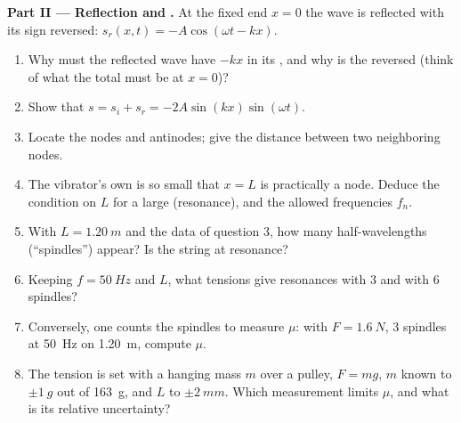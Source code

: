 \begin{problem}
\medskip
\noindent\textbf{Part II --- Reflection and .}
At the fixed end $x = 0$ the wave is reflected with its sign reversed:
$s_r(x, t) = -A\cos(\omega t - kx)$.
\begin{enumerate}[resume]
  \item Why must the reflected wave have $-kx$ in its , and why is
        the  reversed (think of what the total  must be
        at $x = 0$)?
  \item Show that $s = s_i + s_r = -2A\sin(kx)\sin(\omega t)$.
  \item Locate the nodes and antinodes; give the distance between two
        neighboring nodes.
  \item The vibrator's own  is so small that $x = L$ is
        practically a node. Deduce the condition on $L$ for a large
         (resonance), and the allowed frequencies $f_n$.
  \item With $L = \qty{1.20}{m}$ and the data of question 3, how many
        half-wavelengths (``spindles'') appear? Is the string at
        resonance?
  \item Keeping $f = \qty{50}{Hz}$ and $L$, what tensions give
        resonances with $3$ and with $6$ spindles?
  \item Conversely, one counts the spindles to measure $\mu$: with
        $F = \qty{1.6}{N}$, $3$ spindles at \qty{50}{Hz} on \qty{1.20}{m},
        compute $\mu$.
  \item The tension is set with a hanging mass $m$ over a pulley,
        $F = mg$, $m$ known to $\pm\qty{1}{g}$ out of \qty{163}{g}, and
        $L$ to $\pm\qty{2}{mm}$. Which measurement limits $\mu$, and
        what is its relative uncertainty?
\end{enumerate}


\end{problem}
